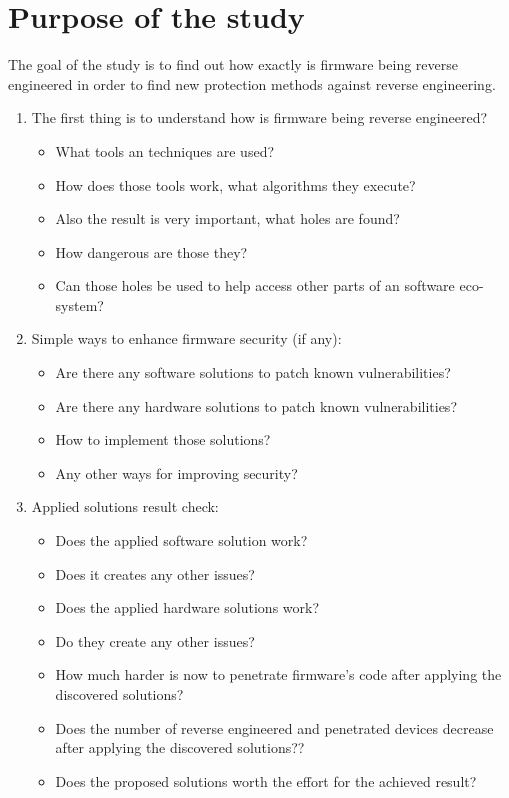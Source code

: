 \documentclass[]{report}
\begin{document}
\section{Purpose of the study} 
The goal of the study is to find out how exactly is firmware being reverse engineered in order to find new protection methods against reverse engineering.
\begin{enumerate}
	\item The first thing is to understand how is firmware being reverse engineered? 
 	\begin{itemize}
 	\item What tools an techniques are used? 
 	\item How does those tools work, what algorithms they execute? 
 	\item Also the result is very important, what holes are found? 
 	\item How dangerous are those they? 
 	\item Can those holes be used to help access other parts of an software eco-system?
 	\end{itemize}

	\item Simple ways to enhance firmware security (if any):
	\begin{itemize}
	\item Are there any software solutions to patch known vulnerabilities?
	\item Are there any hardware solutions to patch known vulnerabilities?
	\item How to implement those solutions?
	\item Any other ways for improving security?
	\end{itemize}

\item Applied solutions result check:
\begin{itemize}
\item Does the applied software solution work?
\item Does it creates any other issues?
\item Does the applied hardware solutions work?
\item Do they create any other issues?
\item How much harder is now to penetrate firmware's code after applying the discovered solutions?
\item Does the number of reverse engineered and penetrated devices decrease after applying the discovered solutions??
\item Does the proposed solutions worth the effort for the achieved result?
\end{itemize}
\end{enumerate}
\end{document}
